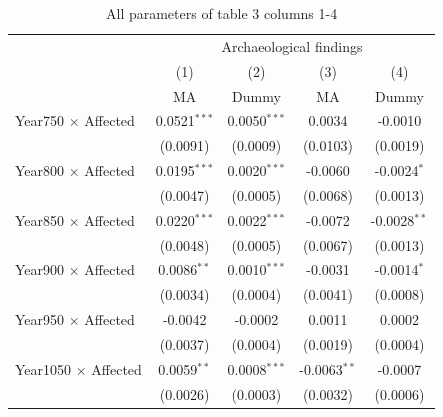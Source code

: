 \begin{table}[H]
\centering
\footnotesize
\caption{\label{tab:A_arch1} All parameters of table 3 columns 1-4}
\begin{tabular}{lcccc}
   \tabularnewline \midrule \midrule
                                                    & \multicolumn{4}{c}{Archaeological findings}\\
                                                    & (1)             & (2)             & (3)                   & (4)\\  
                                                    & MA              & Dummy           & MA                    & Dummy\\
   \midrule
   Year750 $\times$ Affected                        & 0.0521$^{***}$  & 0.0050$^{***}$  & 0.0034                & -0.0010\\   
                                                    & (0.0091)        & (0.0009)        & (0.0103)              & (0.0019)\\   
   Year800 $\times$ Affected                        & 0.0195$^{***}$  & 0.0020$^{***}$  & -0.0060               & -0.0024$^{*}$\\   
                                                    & (0.0047)        & (0.0005)        & (0.0068)              & (0.0013)\\   
   Year850 $\times$ Affected                        & 0.0220$^{***}$  & 0.0022$^{***}$  & -0.0072               & -0.0028$^{**}$\\   
                                                    & (0.0048)        & (0.0005)        & (0.0067)              & (0.0013)\\   
   Year900 $\times$ Affected                        & 0.0086$^{**}$   & 0.0010$^{***}$  & -0.0031               & -0.0014$^{*}$\\   
                                                    & (0.0034)        & (0.0004)        & (0.0041)              & (0.0008)\\   
   Year950 $\times$ Affected                        & -0.0042         & -0.0002         & 0.0011                & 0.0002\\   
                                                    & (0.0037)        & (0.0004)        & (0.0019)              & (0.0004)\\   
   Year1050 $\times$ Affected                       & 0.0059$^{**}$   & 0.0008$^{***}$  & -0.0063$^{**}$        & -0.0007\\   
                                                    & (0.0026)        & (0.0003)        & (0.0032)              & (0.0006)\\   

\end{tabular}
\end{table}
